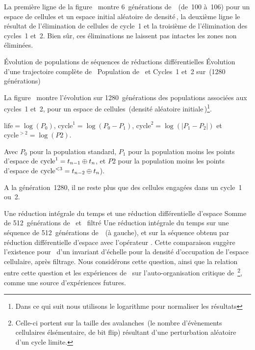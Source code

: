 \noindent%
La première ligne de la figure~ montre
6~générations de~~(de~100 à~106) pour un espace de
 cellules et un espace initial aléatoire de
densité\,\undemi, la deuxième ligne le résultat de l'élimination de
cellules de cycle~1 et la troisième de l'élimination des cycles~1 et~2. %
Bien sûr, ces éliminations ne laissent pas intactes les zones non éliminées. %

%
{Évolution de populations de séquences de réductions dif\-férentiel\-les}%
{Évolution d'une trajectoire complète de~}%
{Population de~ et Cycles~1 et~2 sur~(1280 générations)}

\noindent%
La figure~ montre l'évolution sur 1280~générations
des populations associées aux cycles~1 et~2, pour un espace de
 cellules~(densité aléatoire initiale\,\undemi)\footnote{%
  Dans ce qui suit nous utilisons le logarithme pour normaliser les
  résultats}. %

\noindent%
$\text{life} = \log(P_0)$, %
$\text{cycle}^1 = \log(P_0 - P_1)$, %
$\text{cycle}^2 = \log(|P_1 - P_2|)$ %
et $\text{cycle}^{> 2} = \log (P2)$. %

\noindent%
Avec $P_0$ pour la population standard, %
$P_1$ pour la population moins les points d'espace %
de $\text{cycle}^1 = t_{n-1} \oplus t_{n}$, %
et $P2$ pour la population moins les points d'espace %
de $\text{cycle}^{<3} = t_{n-2} \oplus t_{n}$). %

\noindent%
A la génération~1280, il ne reste plus que des cellules
engagées dans un cycle~1 ou~2. %

%
{Une réduction intégrale du temps et une réduction différentiel\-le d'espace}%
{Somme de 512~générations de~ et~ filtré}%
{Une réduction intégrale du temps sur une séquence de 512~générations
  de~~(à gauche), et sur la séquence obtenu par réduction
  différentielle d'espace avec l'opérateur \xor. %
  Cette comparaison suggère l'existence pour~ d'un
  invariant d'échelle pour la densité d'occupation de l'espace
  cellulaire, après filtrage. %
  Nous considérons cette question, ainsi que la relation entre cette question et les
  expériences de~\cite{Bak93} sur l'auto-organisation critique
  de~\footnote{%
    Celle-ci portent sur la taille des avalanches~(le nombre
    d'évènements cellulaires élsémentaire, \ie de bit flip) résultant
    d'une perturbation aléatoire d'un cycle limite.}, %
  comme une source d'expériences futures.}

